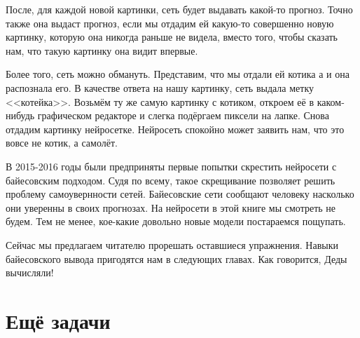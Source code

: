 \documentclass[12pt, a4paper, oneside]{extreport}
\theoremstyle{plain}              %
\theoremstyle{definition}         %
\begin{document}
После, для каждой новой картинки, сеть будет выдавать какой-то прогноз. Точно также она выдаст прогноз, если мы отдадим ей какую-то совершенно новую картинку, которую она никогда раньше не видела, вместо того, чтобы сказать нам, что такую картинку она видит впервые. 

Более того, сеть можно обмануть. Представим, что мы отдали ей котика а и она распознала его. В качестве ответа на нашу картинку, сеть выдала метку <<котейка>>. Возьмём ту же самую картинку с котиком, откроем её в каком-нибудь графическом редакторе и слегка подёргаем пиксели на лапке. Снова отдадим картинку нейросетке. Нейросеть спокойно может заявить нам, что это вовсе не котик, а самолёт. 

В 2015-2016 годы были предприняты первые попытки скрестить нейросети с байесовским подходом. Судя по всему, такое скрещивание позволяет решить проблему самоувернности сетей. Байесовские сети сообщают человеку насколько они уверенны в своих прогнозах. На нейросети в этой книге мы смотреть не будем. Тем не менее, кое-какие довольно новые модели постараемся пощупать.

Сейчас мы предлагаем читателю прорешать оставшиеся упражнения. Навыки байесовского вывода пригодятся нам в следующих главах.  Как говорится, Деды вычисляли! 


\section{Ещё задачи} 
\end{document}
